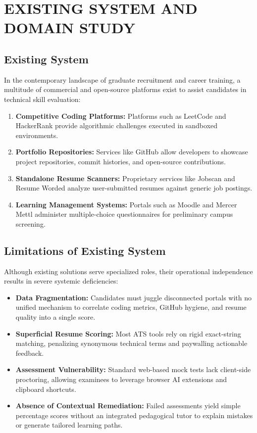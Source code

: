 \chapter{EXISTING SYSTEM AND DOMAIN STUDY}

\section{Existing System}
In the contemporary landscape of graduate recruitment and career training, a multitude of commercial and open-source platforms exist to assist candidates in technical skill evaluation:
\begin{enumerate}
    \item \textbf{Competitive Coding Platforms:} Platforms such as LeetCode and HackerRank provide algorithmic challenges executed in sandboxed environments.
    \item \textbf{Portfolio Repositories:} Services like GitHub allow developers to showcase project repositories, commit histories, and open-source contributions.
    \item \textbf{Standalone Resume Scanners:} Proprietary services like Jobscan and Resume Worded analyze user-submitted resumes against generic job postings.
    \item \textbf{Learning Management Systems:} Portals such as Moodle and Mercer Mettl administer multiple-choice questionnaires for preliminary campus screening.
\end{enumerate}

\section{Limitations of Existing System}
Although existing solutions serve specialized roles, their operational independence results in severe systemic deficiencies:
\begin{itemize}
    \item \textbf{Data Fragmentation:} Candidates must juggle disconnected portals with no unified mechanism to correlate coding metrics, GitHub hygiene, and resume quality into a single score.
    \item \textbf{Superficial Resume Scoring:} Most ATS tools rely on rigid exact-string matching, penalizing synonymous technical terms and paywalling actionable feedback.
    \item \textbf{Assessment Vulnerability:} Standard web-based mock tests lack client-side proctoring, allowing examinees to leverage browser AI extensions and clipboard shortcuts.
    \item \textbf{Absence of Contextual Remediation:} Failed assessments yield simple percentage scores without an integrated pedagogical tutor to explain mistakes or generate tailored learning paths.
\end{itemize}


